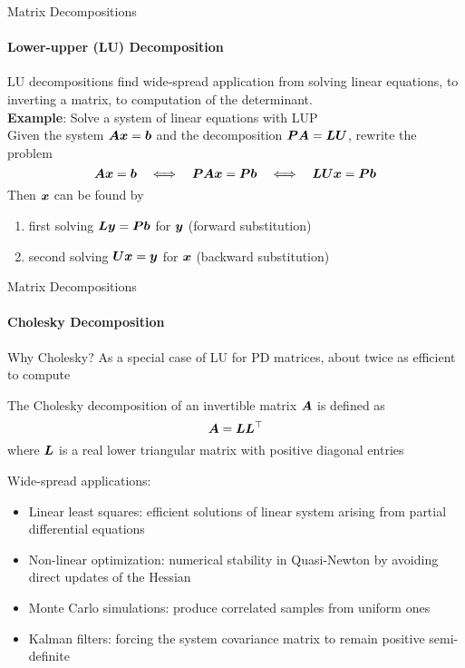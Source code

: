 \begin{frame}{Matrix Decompositions}
    \framesubtitle{Lower-upper (LU) Decomposition}
    LU decompositions find wide-spread application from solving linear equations, to inverting a matrix,
    to computation of the determinant. \\[5mm]

    \textbf{Example}: Solve a system of linear equations with LUP\\
    Given the system $\bm{A} \bm{x} = \bm{b}$ and the decomposition $\bm{P} \bm{A} = \bm{L} \bm{U}$, rewrite the problem
    $$\bm{A} \bm{x} = \bm{b} \quad \Longleftrightarrow \quad \bm{P} \bm{A} \bm{x} = \bm{P} \bm{b} \quad \Longleftrightarrow \quad \bm{L} \bm{U} \bm{x} = \bm{P} \bm{b}$$
    Then $\bm{x}$ can be found by
    \begin{enumerate}
        \item first solving $\bm{L} \bm{y} = \bm{P} \bm{b}$ for $\bm{y}$ (forward substitution)
        \item second solving $\bm{U} \bm{x} = \bm{y}$ for $\bm{x}$ (backward substitution)
    \end{enumerate}
\end{frame}

\begin{frame}{Matrix Decompositions}
    \framesubtitle{Cholesky Decomposition}
    Why Cholesky? As a special case of LU for PD matrices, about twice as efficient to compute

    \begin{boxed}
        The Cholesky decomposition of an invertible matrix $\bm{A}$ is defined as $$\bm{A} = \bm{L} \bm{L}^\top$$
        where $\bm{L}$ is a real lower triangular matrix with positive diagonal entries
    \end{boxed}

    Wide-spread applications:
    \begin{itemize}
        \item Linear least squares: efficient solutions of linear system arising from partial differential equations
        \item Non-linear optimization: numerical stability in Quasi-Newton by avoiding direct updates of the Hessian
        \item Monte Carlo simulations: produce correlated samples from uniform ones
        \item Kalman filters: forcing the system covariance matrix to remain positive semi-definite
    \end{itemize}
\end{frame}


